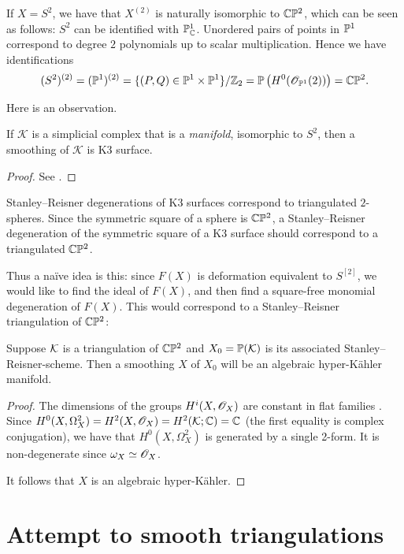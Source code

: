 If $X=S^2$, we have that $X^{(2)}$ is naturally isomorphic to $\C \P^2$, which can be seen as follows: $S^2$ can be identified with $\P^1_\C$. Unordered pairs of points in $\P^1$ correspond to degree $2$ polynomials up to scalar multiplication. Hence we have identifications
$$
(S^2)^{(2)} = (\P^1)^{(2)} = \{ (P,Q) \in \P^1 \times \P^1 \} / \Z_2 = \P\left( H^0(\OO_{\P^1}(2)) \right)=\C \P^2.
$$

Here is an observation.

\begin{lemma}
If $\mathcal K$ is a simplicial complex that is a \emph{manifold}, isomorphic to $S^2$, then a smoothing of $\mathcal K$ is K3 surface.
\end{lemma}
\begin{proof}
See \cite{eisenbud_graphcurves}.
\end{proof}

Stanley--Reisner degenerations of K3 surfaces correspond to triangulated $2$-spheres. Since the symmetric square of a sphere is $\C \P ^2$, a Stanley--Reisner degeneration of the symmetric square of a K3 surface should correspond to a triangulated $\C \P^2$. 

Thus a naïve idea is this: since $F(X)$ is deformation equivalent to $S^{[2]}$, we would like to find the ideal of $F(X)$, and then find a square-free monomial degeneration of $F(X)$. This would correspond to a Stanley--Reisner triangulation of $\C \P^2$:

\begin{proposition}
Suppose $\K$ is a triangulation of $\C \P^2$ and $X_0=\P(\K)$ is its associated Stanley--Reisner-scheme. Then a smoothing $X$ of $X_0$ will be an algebraic hyper-Kähler manifold.
\end{proposition}
\begin{proof}
The dimensions of the groups $H^i(X,\OO_X)$ are constant in flat families . Since $H^0(X,\Omega^2_X)=H^2(X,\OO_X)=H^2(\K;\C)=\C$ (the first equality is complex conjugation), we have that $H^0(X,\Omega^2_X)$ is generated by a single 2-form. It is non-degenerate since $\omega_X \simeq \OO_X$.

It follows that $X$ is an algebraic hyper-Kähler.
\end{proof}

\section{Attempt to smooth triangulations}

